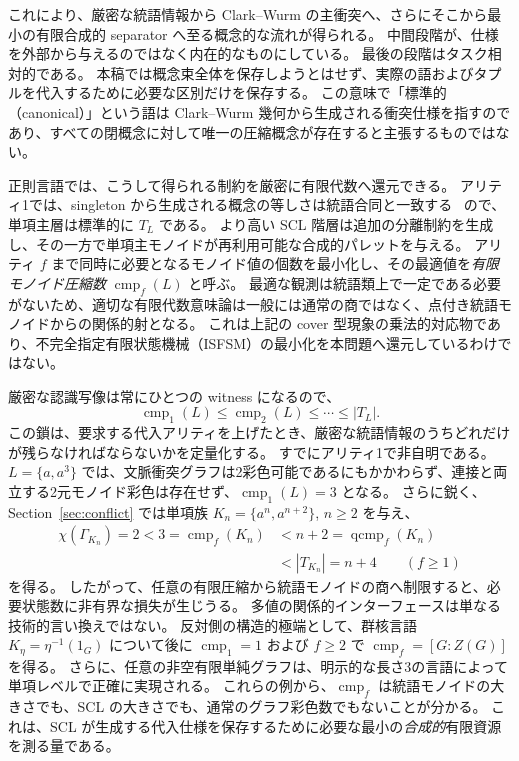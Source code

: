 \documentclass[10pt,a4paper]{ltjsarticle}
\theoremstyle{definition}
\theoremstyle{remark}
\newcommand{\cmp}{\operatorname{cmp}}
\newcommand{\qcmp}{\operatorname{qcmp}}
\begin{document}
これにより、厳密な統語情報から Clark--Wurm の主衝突へ、さらにそこから最小の有限合成的 separator へ至る概念的な流れが得られる。
中間段階が、仕様を外部から与えるのではなく内在的なものにしている。
最後の段階はタスク相対的である。
本稿では概念束全体を保存しようとはせず、実際の語およびタプルを代入するために必要な区別だけを保存する。
この意味で「標準的（canonical）」という語は Clark--Wurm 幾何から生成される衝突仕様を指すのであり、すべての閉概念に対して唯一の圧縮概念が存在すると主張するものではない。

正則言語では、こうして得られる制約を厳密に有限代数へ還元できる。
アリティ1では、singleton から生成される概念の等しさは統語合同と一致する~\cite[Proposition~3.19]{ClarkSCL} ので、単項主層は標準的に $T_L$ である。
より高い SCL 階層は追加の分離制約を生成し、その一方で単項主モノイドが再利用可能な合成的パレットを与える。
アリティ $f$ まで同時に必要となるモノイド値の個数を最小化し、その最適値を\emph{有限モノイド圧縮数} $\cmp_f(L)$ と呼ぶ。
最適な観測は統語類上で一定である必要がないため、適切な有限代数意味論は一般には通常の商ではなく、点付き統語モノイドからの関係的射となる。
これは上記の cover 型現象の乗法的対応物であり、不完全指定有限状態機械（ISFSM）の最小化を本問題へ還元しているわけではない。

厳密な認識写像は常にひとつの witness になるので、
\[
\cmp_1(L)\le \cmp_2(L)\le\cdots\le |T_L|.
\]
この鎖は、要求する代入アリティを上げたとき、厳密な統語情報のうちどれだけが残らなければならないかを定量化する。
すでにアリティ1で非自明である。
$L=\{a,a^3\}$ では、文脈衝突グラフは2彩色可能であるにもかかわらず、連接と両立する2元モノイド彩色は存在せず、$\cmp_1(L)=3$ となる。
さらに鋭く、Section~\ref{sec:conflict} では単項族 $K_n=\{a^n,a^{n+2}\}$, $n\ge2$ を与え、
\[
\begin{aligned}
 \chi(\Gamma_{K_n})=2<3=\cmp_f(K_n)&<n+2=\qcmp_f(K_n)\\
 &<|T_{K_n}|=n+4 \qquad(f\ge1)
\end{aligned}
\]
を得る。
したがって、任意の有限圧縮から統語モノイドの商へ制限すると、必要状態数に非有界な損失が生じうる。
多値の関係的インターフェースは単なる技術的言い換えではない。
反対側の構造的極端として、群核言語 $K_\eta=\eta^{-1}(1_G)$ について後に
$\cmp_1=1$ および $f\ge2$ で $\cmp_f=[G:Z(G)]$ を得る。
さらに、任意の非空有限単純グラフは、明示的な長さ3の言語によって単項レベルで正確に実現される。
これらの例から、$\cmp_f$ は統語モノイドの大きさでも、SCL の大きさでも、通常のグラフ彩色数でもないことが分かる。
これは、SCL が生成する代入仕様を保存するために必要な最小の\emph{合成的}有限資源を測る量である。
\end{document}
